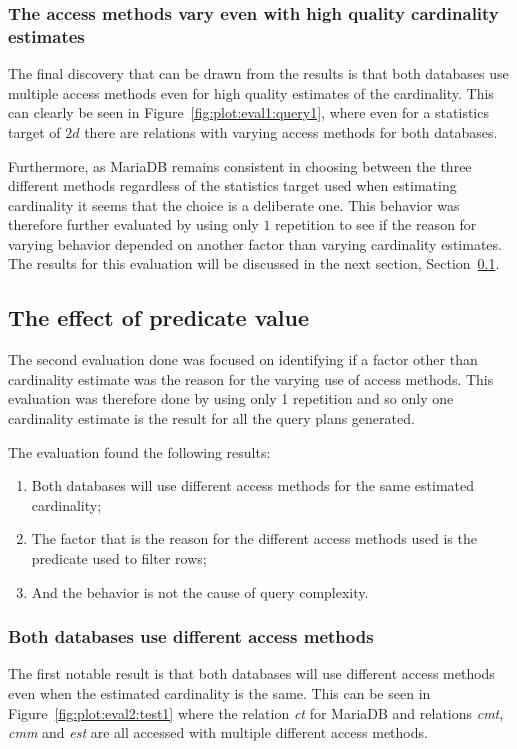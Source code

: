 \subsubsection{The access methods vary even with high quality cardinality estimates}
The final discovery that can be drawn from the results is that both databases
use multiple access methods even for high quality estimates of the cardinality.
This can clearly be seen in Figure~\ref{fig:plot:eval1:query1}, where even for a
statistics target of $2d$ there are relations with varying access methods for both
databases.

Furthermore, as MariaDB remains consistent in choosing between the three
different methods regardless of the statistics target used when estimating
cardinality it seems that the choice is a deliberate one. This behavior was
therefore further evaluated by using only $1$ repetition to see if the reason for
varying behavior depended on another factor than varying cardinality estimates.
The results for this evaluation will be discussed in the next section,
Section~\ref{sec:predicatecorrelation}.

\subsection{The effect of predicate value}\label{sec:predicatecorrelation}
The second evaluation done was focused on identifying if a factor other than
cardinality estimate was the reason for the varying use of access methods. This
evaluation was therefore done by using only 1 repetition and so only one
cardinality estimate is the result for all the query plans generated.

The evaluation found the following results:
\begin{enumerate}
\item Both databases will use different access methods for the same estimated
  cardinality;
\item The factor that is the reason for the different access methods used is the
  predicate used to filter rows;
\item And the behavior is not the cause of query complexity.
\end{enumerate}

\subsubsection{Both databases use different access methods}
The first notable result is that both databases will use different access
methods even when the estimated cardinality is the same. This can be
seen in Figure~\ref{fig:plot:eval2:test1} where the relation \textit{ct} for
MariaDB and relations \textit{cmt}, \textit{cmm} and \textit{est} are all
accessed with multiple different access methods.

